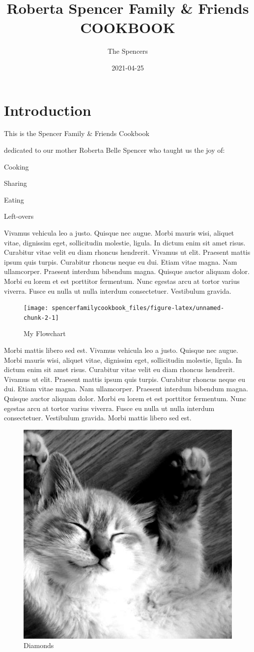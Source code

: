 \documentclass[
]{book}
\title{Roberta Spencer Family \& Friends COOKBOOK}
\author{The Spencers}
\date{2021-04-25}
\begin{document}
\maketitle

{
\setcounter{tocdepth}{1}
\tableofcontents
}
\hypertarget{introduction}{%
\chapter{Introduction}\label{introduction}}

This is the Spencer Family \& Friends Cookbook

dedicated to our mother Roberta Belle Spencer who taught us the joy of:

Cooking

Sharing

Eating

Left-overs

Vivamus vehicula leo a justo. Quisque nec augue. Morbi mauris wisi, aliquet vitae, dignissim eget, sollicitudin molestie, ligula. In dictum enim sit amet risus. Curabitur vitae velit eu diam rhoncus hendrerit. Vivamus ut elit. Praesent mattis ipsum quis turpis. Curabitur rhoncus neque eu dui. Etiam vitae magna. Nam ullamcorper. Praesent interdum bibendum magna. Quisque auctor aliquam dolor. Morbi eu lorem et est porttitor fermentum. Nunc egestas arcu at tortor varius viverra. Fusce eu nulla ut nulla interdum consectetuer. Vestibulum gravida.

\begin{figure}

\hfill{}\texttt{[image: spencerfamilycookbook\_files/figure-latex/unnamed-chunk-2-1]} 

\caption{My Flowchart}\label{fig:unnamed-chunk-2}
\end{figure}

Morbi mattis libero sed est. Vivamus vehicula leo a justo. Quisque nec augue. Morbi mauris wisi, aliquet vitae, dignissim eget, sollicitudin molestie, ligula. In dictum enim sit amet risus. Curabitur vitae velit eu diam rhoncus hendrerit. Vivamus ut elit. Praesent mattis ipsum quis turpis. Curabitur rhoncus neque eu dui. Etiam vitae magna. Nam ullamcorper. Praesent interdum bibendum magna. Quisque auctor aliquam dolor. Morbi eu lorem et est porttitor fermentum. Nunc egestas arcu at tortor varius viverra. Fusce eu nulla ut nulla interdum consectetuer. Vestibulum gravida. Morbi mattis libero sed est.

\begin{figure}  
 \begin{center}
    \includegraphics[width=.2\textwidth]{"images/500.jpg"}
  \caption{Diamonds} 
\end{center}
\end{figure}
\end{document}
